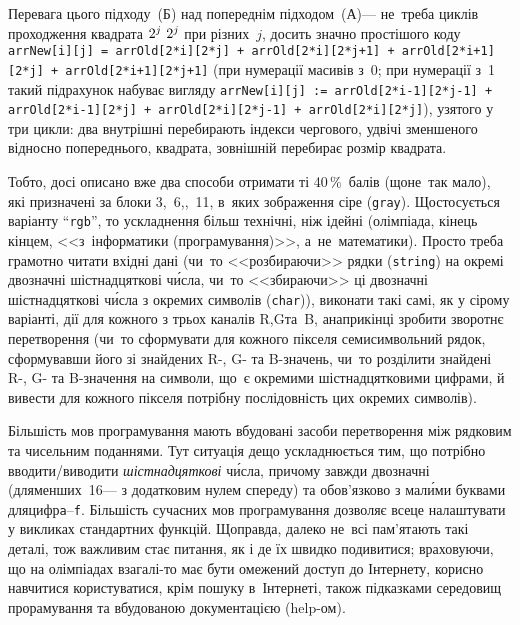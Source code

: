 Перевага цього підходу~(Б) над попереднім підходом~(А)\nolinebreak[3] --- 
не~треба циклів
проходження квадрата ${2^j\,{\*}\,2^j}$ при різних~$j$, досить значно простішого коду \texttt{\mbox{arrNew[i][j]} = \mbox{arrOld[2*i][2*j]} + \mbox{arrOld[2*i][2*j+1]} + \mbox{arrOld[2*i+1][2*j]} + \mbox{arrOld[2*i+1][2*j+1]}} (при нумерації масивів з~0; при нумерації з~1 такий підрахунок набуває вигляду \texttt{\mbox{arrNew[i][j]} := \mbox{arrOld[2*i-1][2*j-1]} + \mbox{arrOld[2*i-1][2*j]} + \mbox{arrOld[2*i][2*j-1]} + \mbox{arrOld[2*i][2*j]}}), узятого у три цикли: два внутрішні перебирають індекси чергового, удвічі зменшеного відносно попереднього, квадрата, зовнішній перебирає розмір квадрата.

Тобто, досі описано вже два способи отримати ті 40$\,$\%~балів (що\nolinebreak[3] не~так мало), які призначені за блоки 3,~6,,~11, в~яких зображення сіре (\texttt{gray}).
Що\nolinebreak[3] стосується варіанту ``\texttt{rgb}'', то ускладнення більш технічні, ніж ідейні (олімпіада, кінець кінцем, <<з~інформатики (програмування)>>, а~не~математики). Просто треба грамотно читати вхідні дані (чи~то <<розбираючи>> рядки (\texttt{string}) на окремі двозначні шістнадцяткові ч\'{и}сла, чи~то <<збираючи>> ці двозначні шістнадцяткові ч\'{и}сла з окремих символів (\texttt{char})), виконати такі самі, як у сірому варіанті, дії для кожного з трьох каналів R,\nolinebreak[3] G\nolinebreak[3] та~B, а\nolinebreak[3] наприкінці зробити зворотнє перетворення (чи~то сформувати для кожного пікселя семисимвольний рядок, сформувавши його зі знайдених R-, G- та B-значень, чи~то розділити знайдені R-, G- та B-значення на символи, що~є окремими шістнадцятковими цифрами, й вивести для кожного пікселя потрібну послідовність цих окремих символів).

Більшість мов програмування мають вбудовані засоби перетворення між рядковим та чисельним поданнями. Тут ситуація дещо ускладнюється тим, що потрібно вводити/виводити \emph{шістнадцяткові} ч\'{и}сла, причому завжди двозначні (для\nolinebreak[2] менших~16\nolinebreak[3] --- з додатковим нулем спереду) та обов'язково з мал\'{и}ми буквами для\nolinebreak[2] цифр\nolinebreak[3] \mbox{\texttt{a}--\texttt{f}}. Більшість сучасних мов програмування дозволяє все\nolinebreak[3] це налаштувати у викликах стандартних функцій. Щоправда, далеко не~всі пам'ятають такі деталі, тож важливим стає питання, як і де їх швидко подивитися; враховуючи, що на олімпіадах взагалі-то має бути омежений доступ до Інтернету, корисно навчитися користуватися, крім пошуку в~Інтернеті, також підказками середовищ прорамування та вбудованою документацією (help-ом).

